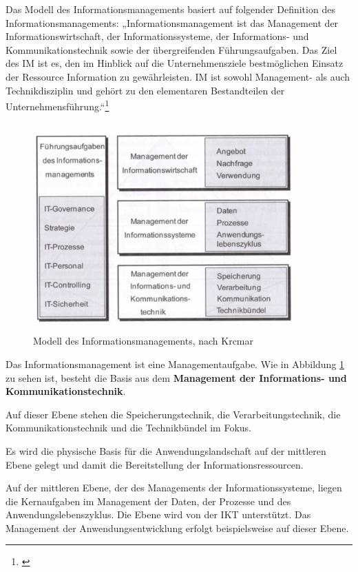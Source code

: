 Das Modell des Informationsmanagements basiert auf folgender Definition des Informationsmanagements:
„Informationsmanagement ist das Management der Informationswirtschaft, der Informationssysteme, der Informations- und Kommunikationstechnik sowie der übergreifenden Führungsaufgaben. Das Ziel des IM ist es, den im Hinblick auf die Unternehmensziele bestmöglichen Einsatz der Ressource Information zu gewährleisten. IM ist sowohl Management- als auch Technikdisziplin und gehört zu den elementaren Bestandteilen der Unternehmensführung.“\footnote{\cite{krcmar_einfuhrung_2015}}

\begin{figure}[h!]
	\centering
	\includegraphics[width=10cm, height=8cm]
	{kapitel/gruppe1_1/bilder/modell_des_inm}
	\caption{Modell des Informationsmanagements, nach Krcmar}
	\label{fig_modell_des_inm}
\end{figure}

Das Informationsmanagement ist eine Managementaufgabe. Wie in Abbildung \ref{fig_modell_des_inm} zu sehen ist, besteht die Basis aus dem \textbf{Management der Informations- und Kommunikationstechnik}.

Auf dieser Ebene stehen die Speicherungstechnik, die Verarbeitungstechnik, die Kommunikationstechnik und die Technikbündel im Fokus.

Es wird die physische Basis für die Anwendungslandschaft auf der mittleren Ebene gelegt und damit die Bereitstellung der Informationsressourcen.

Auf der mittleren Ebene, der des Managements der Informationssysteme, liegen die Kernaufgaben im Management der Daten, der Prozesse und des Anwendungslebenszyklus. Die Ebene wird von der IKT unterstützt. Das Management der Anwendungsentwicklung erfolgt beispielsweise auf dieser Ebene.

